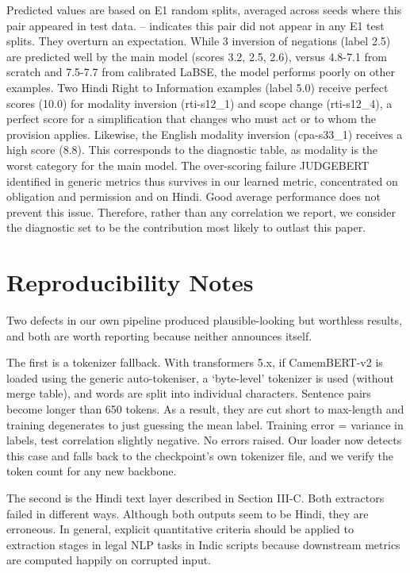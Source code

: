 \documentclass[conference]{IEEEtran}
\begin{document}
Predicted values are based on E1 random splits, averaged across seeds where this pair appeared in test data. – indicates this pair did not appear in any E1 test splits. They overturn an expectation. While 3 inversion of negations (label 2.5) are predicted well by the main model (scores 3.2, 2.5, 2.6), versus 4.8-7.1 from scratch and 7.5-7.7 from calibrated LaBSE, the model performs poorly on other examples. Two Hindi Right to Information examples (label 5.0) receive perfect scores (10.0) for modality inversion (rti-s12\_1) and scope change (rti-s12\_4), a perfect score for a simplification that changes who must act or to whom the provision applies. Likewise, the English modality inversion (cpa-s33\_1) receives a high score (8.8). This corresponds to the diagnostic table, as modality is the worst category for the main model. The over-scoring failure JUDGEBERT identified in generic metrics thus survives in our learned metric, concentrated on obligation and permission and on Hindi. Good average performance does not prevent this issue. Therefore, rather than any correlation we report, we consider the diagnostic set to be the contribution most likely to outlast this paper.

\section{Reproducibility Notes}

Two defects in our own pipeline produced plausible-looking but worthless results, and both are worth reporting because neither announces itself.

The first is a tokenizer fallback. With transformers 5.x, if CamemBERT-v2 is loaded using the generic auto-tokeniser, a ‘byte-level’ tokenizer is used (without merge table), and words are split into individual characters. Sentence pairs become longer than 650 tokens. As a result, they are cut short to max-length and training degenerates to just guessing the mean label. Training error = variance in labels, test correlation slightly negative. No errors raised. Our loader now detects this case and falls back to the checkpoint's own tokenizer file, and we verify the token count for any new backbone.

The second is the Hindi text layer described in Section III-C. Both extractors failed in different ways. Although both outputs seem to be Hindi, they are erroneous. In general, explicit quantitative criteria should be applied to extraction stages in legal NLP tasks in Indic scripts because downstream metrics are computed happily on corrupted input.
\end{document}
